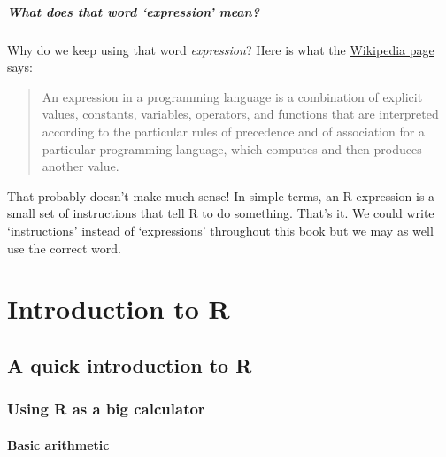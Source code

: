 \documentclass[
]{book}
\newenvironment{greybox}{
  \definecolor{shadecolor}{rgb}{0.95,0.95,0.95}  %
  \color{black}
  \begin{shaded}}
 {\end{shaded}}
\newenvironment{infobox}[1]
  {
  \begin{itemize}
  \renewcommand{\labelitemi}{
    \raisebox{-.7\height}[0pt][0pt]{
      {\setkeys{Gin}{width=3em,keepaspectratio}
        \texttt{[image: images/\#1]}}
    }
  }
  \setlength{\fboxsep}{1em}
  \begin{greybox}
  \item
  }
  {
  \end{greybox}
  \end{itemize}
  }
\begin{document}
\begin{infobox}{information}

\hypertarget{what-does-that-word-expression-mean}{%
\subsubsection*{What does that word `expression' mean?}\label{what-does-that-word-expression-mean}}

Why do we keep using that word \emph{expression}? Here is what the \href{http://en.wikipedia.org/wiki/Expression_(computer_science)}{Wikipedia page} says:

\begin{quote}
An expression in a programming language is a combination of explicit values, constants, variables, operators, and functions that are interpreted according to the particular rules of precedence and of association for a particular programming language, which computes and then produces another value.
\end{quote}

That probably doesn't make much sense! In simple terms, an R expression is a small set of instructions that tell R to do something. That's it. We could write `instructions' instead of `expressions' throughout this book but we may as well use the correct word.

\end{infobox}

\hypertarget{part-introduction-to-r}{%
\part{Introduction to R}\label{part-introduction-to-r}}

\hypertarget{quick-intro-to-r}{%
\chapter{A quick introduction to R}\label{quick-intro-to-r}}

\hypertarget{r-calculator}{%
\section{Using R as a big calculator}\label{r-calculator}}

\hypertarget{basic-arithmetic}{%
\subsection{Basic arithmetic}\label{basic-arithmetic}}
\end{document}
